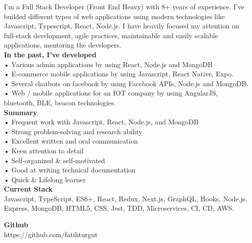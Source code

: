 

\begin{cvparagraph}

I'm a Full Stack Developer (Front End Heavy) with 8+ years of experience. I've builded different types of web applications using modern technologies like Javascript, Typescript, React, Node.js. I have heavily focused my attention on full-stack development, agile practices, maintainable and easily scalable applications, mentoring the developers. \\

\textbf {In the past, I've developed} \\
• Various admin applications by using React, Node.js and MongoDB \\
• E-commerce mobile applications by using Javascript, React Native, Expo. \\
• Several chatbots on facebook by using Facebook APIs, Node.js and MongoDB. \\
• Web / mobile applications for an IOT company by using AngularJS, bluetooth, BLE, beacon technologies. \\

\textbf {Summary} \\
• Frequent work with Javascript, React, Node.js, and MongoDB \\
• Strong problem-solving and research ability \\
• Excellent written and oral communication \\
• Keen attention to detail \\
• Self-organized {\&} self-motivated \\
• Good at writing technical documentation \\
• Quick {\&} Lifelong learner \\


\textbf {Current Stack} \\
Javascript, TypeScript, ES6+, React, Redux, Next.js, GraphQL, Hooks, Node.js, Express, MongoDB, HTML5, CSS, Jest, TDD, Microservices, CI, CD, AWS.

\textbf {Github} \\
https://github.com/fatihturgut

\end{cvparagraph}
